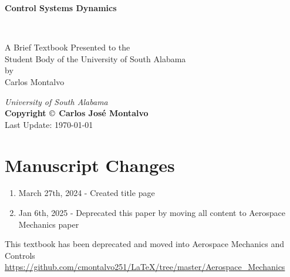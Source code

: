 \documentclass{article}
\begin{document}
\begin{center}
\begin{LARGE}{\bf Control Systems Dynamics}\end{LARGE}\\
\large
\vspace{22 mm}
\begin{singlespace}
   A Brief Textbook Presented to the \\ 
   Student Body of the University of South Alabama \\
\vspace{22 mm}
   by\\
\vspace{22 mm}
  Carlos Montalvo \\
\vspace{22 mm}
\end{singlespace}
{\itshape University of South Alabama}\\
{\bf Copyright $\copyright$ Carlos Jos\'{e} Montalvo}
\\ Last Update: \today
\end{center}

\newpage

\section*{Manuscript Changes}

\begin{enumerate}[itemsep=-5pt]
\item March 27th, 2024 - Created title page
\item Jan 6th, 2025 - Deprecated this paper by moving all
  content to Aerospace Mechanics paper
\end{enumerate}

\noindent This textbook has been deprecated and moved into Aerospace
Mechanics and Controls
\url{https://github.com/cmontalvo251/LaTeX/tree/master/Aerospace_Mechanics}
\end{document}
